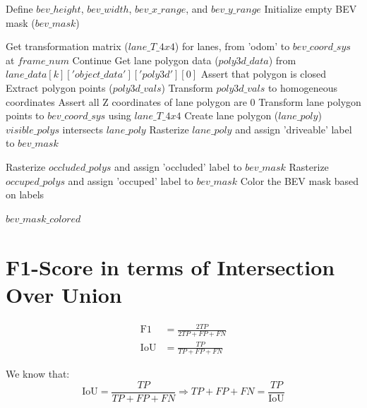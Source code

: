 \begin{algorithm}
\begin{algorithmic}[1]
        \State Define $bev\_height$, $bev\_width$, $bev\_x\_range$, and $bev\_y\_range$
        \State Initialize empty BEV mask ($bev\_mask$)

        \State Get transformation matrix ($lane\_T\_4x4$) for lanes, from 'odom' to $bev\_coord\_sys$ at $frame\_num$
          
                \State Continue  
            \EndIf
            \State Get lane polygon data ($poly3d\_data$) from $lane\_data[k]['object\_data']['poly3d'][0]$
            \State Assert that polygon is closed
            \State Extract polygon points ($poly3d\_vals$)
            \State Transform $poly3d\_vals$ to homogeneous coordinates
            \State Assert all Z coordinates of lane polygon are 0
            \State Transform lane polygon points to $bev\_coord\_sys$ using $lane\_T\_4x4$
            \State Create lane polygon ($lane\_poly$)
            \If $visible\_polys$ intersects $lane\_poly$
                \State Rasterize $lane\_poly$ and assign 'driveable' label to $bev\_mask$
            \EndIf
        \EndFor

        \State Rasterize $occluded\_polys$ and assign 'occluded' label to $bev\_mask$
        \State Rasterize $occuped\_polys$ and assign 'occuped' label to $bev\_mask$
        \State Color the BEV mask based on labels  

        \State \Return $bev\_mask\_colored$
    \end{algorithmic}
\end{algorithm}


\section{F1-Score in terms of Intersection Over Union} \label{appendix:f1_iou}
\begin{equation}
    \begin{aligned}
    \text{F1} &= \frac{2TP}{2TP + FP + FN} \\
    \text{IoU} &= \frac{TP}{TP + FP + FN}
    \end{aligned}
    \label{eq:system}
    \end{equation}
    
    \noindent
    We know that:
    \[
    \text{IoU} = \frac{TP}{TP + FP + FN} \Rightarrow TP + FP + FN = \frac{TP}{\text{IoU}}
    \]
    
